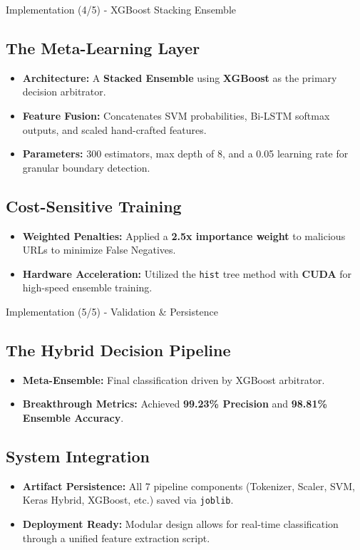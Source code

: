 \documentclass[aspectratio=169,xcolor=dvipsnames]{beamer}
\begin{document}
\begin{frame}{Implementation (4/5) - XGBoost Stacking Ensemble}
\subsection{The Meta-Learning Layer}
\begin{itemize}
    \item \textbf{Architecture:} A \textbf{Stacked Ensemble} using \textbf{XGBoost} as the primary decision arbitrator.
    \item \textbf{Feature Fusion:} Concatenates SVM probabilities, Bi-LSTM softmax outputs, and scaled hand-crafted features.
    \item \textbf{Parameters:} 300 estimators, max depth of 8, and a 0.05 learning rate for granular boundary detection.
\end{itemize}

\subsection{Cost-Sensitive Training}
\begin{itemize}
    \item \textbf{Weighted Penalties:} Applied a \textbf{2.5x importance weight} to malicious URLs to minimize False Negatives.
    \item \textbf{Hardware Acceleration:} Utilized the \texttt{hist} tree method with \textbf{CUDA} for high-speed ensemble training.
\end{itemize}
\end{frame}

\begin{frame}{Implementation (5/5) - Validation \& Persistence}
\subsection{The Hybrid Decision Pipeline}
\begin{itemize}
    \item \textbf{Meta-Ensemble:} Final classification driven by XGBoost arbitrator.
    \item \textbf{Breakthrough Metrics:} Achieved \textbf{99.23\% Precision} and \textbf{98.81\% Ensemble Accuracy}.
\end{itemize}

\subsection{System Integration}
\begin{itemize}
    \item \textbf{Artifact Persistence:} All 7 pipeline components (Tokenizer, Scaler, SVM, Keras Hybrid, XGBoost, etc.) saved via \texttt{joblib}.
    \item \textbf{Deployment Ready:} Modular design allows for real-time classification through a unified feature extraction script.
\end{itemize}
\end{frame}
\end{document}
